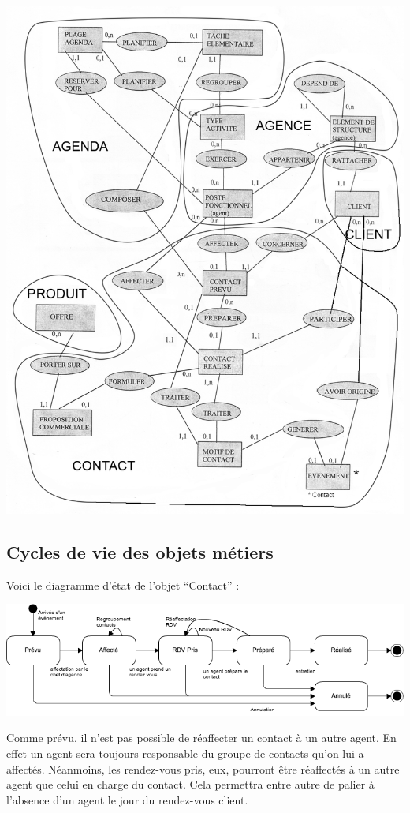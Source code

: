 \begin {center}
\includegraphics[width=\textwidth]{Decoupage MCD 2.png}
\end {center}

\subsection{Cycles de vie des objets métiers}

Voici le diagramme d'état de l'objet ``Contact'' :

\begin {center}
\includegraphics[width=\textwidth]{diagramme-etat-objet-contact.png}
\end {center}
Comme prévu, il n'est pas possible de réaffecter un contact à un autre agent. En effet un agent sera toujours responsable du groupe de contacts qu'on lui a affectés. Néanmoins, les rendez-vous pris, eux, pourront être réaffectés à un autre agent que celui en charge du contact. Cela permettra entre autre de palier à l'absence d'un agent le jour du rendez-vous client.


